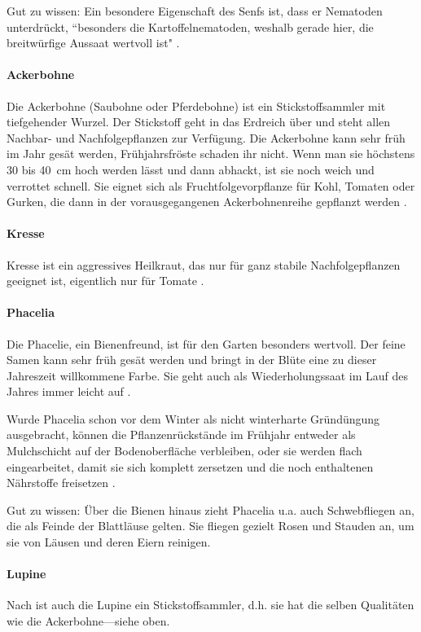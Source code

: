 Gut zu wissen:
Ein besondere Eigenschaft des Senfs ist, dass er Nematoden unterdrückt, ``besonders die Kartoffelnematoden, weshalb gerade hier, die breitwürfige Aussaat wertvoll ist" \citep[S.~39]{Franck1981}.

\paragraph{Ackerbohne}
Die Ackerbohne (Saubohne oder Pferdebohne) ist ein Stickstoffsammler mit tiefgehender Wurzel.
Der Stickstoff geht in das Erdreich über und steht allen Nachbar- und Nachfolgepflanzen zur Verfügung.
Die Ackerbohne kann sehr früh im Jahr gesät werden, Frühjahrsfröste schaden ihr nicht.
Wenn man sie höchstens 30 bis 40~cm hoch werden lässt und dann abhackt, ist sie noch weich und verrottet schnell.
Sie eignet sich als Fruchtfolgevorpflanze für Kohl, Tomaten oder Gurken, die dann in der vorausgegangenen Ackerbohnenreihe gepflanzt werden \citep[S.~39]{Franck1981}.

\paragraph{Kresse}
Kresse ist ein aggressives Heilkraut, das nur für ganz stabile Nachfolgepflanzen geeignet ist, eigentlich nur für Tomate \citep[S.~39]{Franck1981}.

\paragraph{Phacelia}
Die Phacelie, ein Bienenfreund, ist für den Garten besonders wertvoll.
Der feine Samen kann sehr früh gesät werden und bringt in der Blüte eine zu dieser Jahreszeit willkommene Farbe.
Sie geht auch als Wiederholungssaat im Lauf des Jahres immer leicht auf \citep{Franck1981}.

Wurde Phacelia schon vor dem Winter als nicht winterharte Gründüngung ausgebracht, können die Pflanzenrückstände im Frühjahr entweder als Mulchschicht auf der Bodenoberfläche verbleiben, oder sie werden flach eingearbeitet, damit sie sich komplett zersetzen und die noch enthaltenen Nährstoffe freisetzen \citep[S.~11]{Heberer2018}.

Gut zu wissen: 
Über die Bienen hinaus zieht Phacelia u.a. auch Schwebfliegen an, die als Feinde der Blattläuse gelten.
Sie fliegen gezielt Rosen und Stauden an, um sie von Läusen und deren Eiern reinigen.

\paragraph{Lupine}
Nach \citet{Schwinn2025} ist auch die Lupine ein Stickstoffsammler, d.h. sie hat die selben Qualitäten wie die Ackerbohne---siehe oben.

